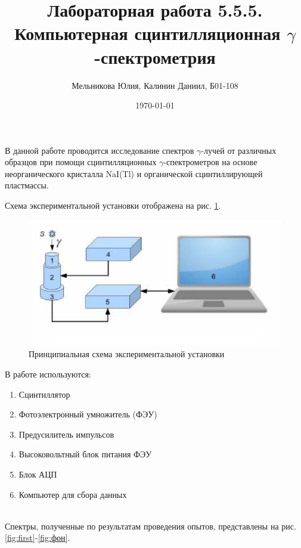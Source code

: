 \documentclass[a4paper]{article}
\author{Мельникова Юлия, Калинин Даниил, Б01-108}
\date{\today}
\title{Лабораторная работа 5.5.5. Компьютерная сцинтилляционная $\gamma$-спектрометрия}
\begin{document}
\maketitle
\parindent=0cm

В данной работе проводится исследование спектров $\gamma$-лучей от различных образцов при помощи сцинтилляционных $\gamma$-спектрометров на основе неорганического кристалла NaI(Tl) и органической сцинтиллирующей пластмассы. 


Схема экспериментальной установки отображена на рис. \ref{fig:screenshot1}.
\begin{figure}
	\centering
	\includegraphics[width=0.7\linewidth]{Screenshot_1}
	\caption{Принципиальная схема экспериментальной установки}
	\label{fig:screenshot1}
\end{figure}


В работе используются:
\begin{enumerate}
    \item{Сцинтиллятор}
	\item{Фотоэлектронный умножитель (ФЭУ)}
	\item{Предусилитель импульсов}
	\item{Высоковольтный блок питания ФЭУ}
	\item{Блок АЦП}
	\item{Компьютер для сбора данных}
\end{enumerate}

 ~\\

Спектры, полученные по результатам проведения опытов, представлены на рис. \ref{fig:first}-\ref{fig:фон}.
\end{document}
